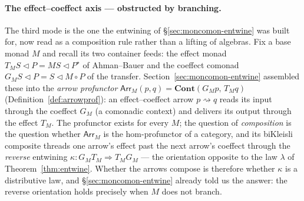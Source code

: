 \documentclass[11pt,a4paper]{book}
\newcommand{\Cont}{\mathbf{Cont}}
\newcommand{\cont}[2]{#1 \triangleleft #2}
\newcommand{\Arr}{\mathsf{Arr}}
\theoremstyle{plain}
\theoremstyle{definition}
\theoremstyle{remark}
\begin{document}
\paragraph{The effect--coeffect axis --- obstructed by branching.}
The third mode is the one the entwining of \S\ref{sec:moncomon-entwine} was built
for, now read as a composition rule rather than a lifting of algebras. Fix a base
monad $M$ and recall its two container feeds: the effect monad
$T_{M}\cont SP=\cont{MS}{P^{\star}}$ of Ahman--Bauer and the coeffect comonad
$G_{M}\cont SP=\cont S{M\circ P}$ of the transfer. Section~\ref{sec:moncomon-entwine}
assembled these into the \emph{arrow profunctor} $\Arr_{M}(p,q)=\Cont(G_{M}p,\,T_{M}q)$
(Definition~\ref{def:arrowprof}): an effect--coeffect arrow $p\rightsquigarrow q$ reads
its input through the coeffect $G_{M}$ (a comonadic context) and delivers its output
through the effect $T_{M}$. The profunctor exists for every $M$; the question of
\emph{composition} is the question whether $\Arr_{M}$ is the hom-profunctor of a
category, and its biKleisli composite threads one arrow's effect past the next arrow's
coeffect through the \emph{reverse} entwining $\kappa\colon G_{M}T_{M}\Rightarrow T_{M}G_{M}$
--- the orientation opposite to the law $\lambda$ of Theorem~\ref{thm:entwine}. Whether
the arrows compose is therefore whether $\kappa$ is a distributive law, and
\S\ref{sec:moncomon-entwine} already told us the answer: the reverse orientation holds
precisely when $M$ does not branch.
\end{document}
